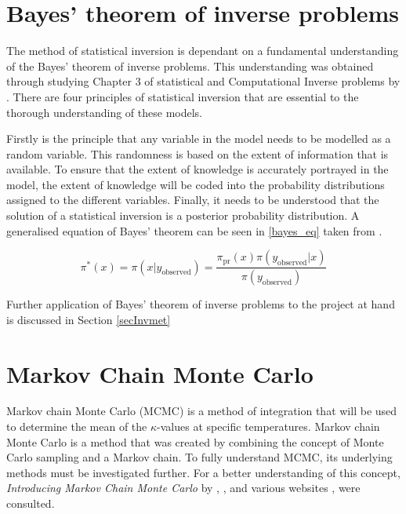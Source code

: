 %
%	

	
\section{Bayes' theorem of inverse problems}

	The method of statistical inversion is dependant on a fundamental understanding of the Bayes' theorem of inverse problems. 
	This understanding was obtained through studying Chapter 3 of statistical and Computational Inverse problems by \citet{Kaipo:2005}.
	There are four principles of statistical inversion that are essential to the thorough understanding of these models.

	Firstly is the principle that any variable in the model needs to be modelled as a random variable.
	This randomness is based on the extent of information that is available. 
	To ensure that the extent of knowledge is accurately portrayed in the model, the extent of knowledge will be coded into the probability distributions assigned to the different variables. 
	Finally, it needs to be understood that the solution of a statistical inversion is a posterior probability distribution.
	A generalised equation of Bayes' theorem can be seen in \ref{bayes_eq} taken from \citet{Kaipo:2005}.
	
	\begin{equation}
	\label{bayes_eq}
	\pi^* (x) = \pi (x|y_{\text{observed}}) = \frac{\pi_{\text{pr}} (x) \pi (y_{\text{observed}}|x)}{\pi  (y_{\text{observed}})}	
	\end{equation}
	
Further application of Bayes' theorem of inverse problems to the project at hand is discussed in Section \ref{secInvmet}
\section{Markov Chain Monte Carlo} \label{MCMCdet}
Markov chain Monte Carlo  (MCMC) is a method of integration that will be used to determine the mean of the $\kappa$-values at specific temperatures. 
	Markov chain Monte Carlo is a method that was created by combining the concept of Monte Carlo sampling  and a Markov chain. 
	To fully understand MCMC, its underlying methods must be investigated further.
	For a better understanding of this concept, \textit{Introducing Markov Chain Monte Carlo} by \citet{Gilks:1996}, \citet{Kaipo:2005}, and various websites \citet{MLM:2019}, \citet{dummies:2015} were consulted.

